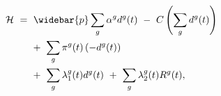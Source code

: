 \begin{equation}
\begin{split}
    \mathcal{H} \ 
    & = \ \widebar{p} \sum_{g} \alpha^{g} d^{g}(t) \ - \ C\left( \sum_{g} d^{g}(t) \right) \\
    & \hspace{0.5cm} + \ \sum_{g} \pi^{g}(t) \left( -d^{g}(t) \right) \\
    & \hspace{0.5cm} + \ \sum_{g} \lambda_{1}^{g}(t) d^{g}(t) \ + \ \sum_{g} \lambda_{2}^{g}(t) R^{g}(t),
\end{split}
\label{Equation:AKS-Style-Model_Current-Value-Hamiltonian}
\end{equation}
